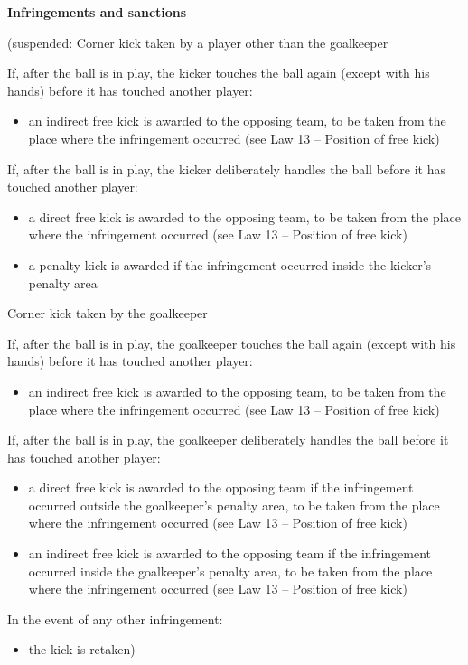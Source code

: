 \bigskip

{\bfseries Infringements and sanctions}

\headlinebox

{\color[rgb]{0.4,0.4,0.4}
(suspended: Corner kick taken by a player other than the goalkeeper

If, after the ball is in play, the kicker touches the ball again (except
with his hands) before it has touched another player:

\begin{itemize}
\item an indirect free kick is awarded to the opposing team, to be taken from
the place where the infringement occurred (see Law 13 -- Position of
free kick)
\end{itemize}

\bigskip

If, after the ball is in play, the kicker deliberately handles the ball
before it has touched another player:

\begin{itemize}
\item a direct free kick is awarded to the opposing team, to be taken from the
place where the infringement occurred (see Law 13 -- Position of free
kick) 
\item a penalty kick is awarded if the infringement occurred inside the
kicker{\textquoteright}s penalty area 
\end{itemize}

\bigskip

Corner kick taken by the goalkeeper

If, after the ball is in play, the goalkeeper touches the ball again
(except with his hands) before it has touched another player:

\begin{itemize}
\item an indirect free kick is awarded to the opposing team, to be taken from
the place where the infringement occurred (see Law 13 -- Position of
free kick)
\end{itemize}

\bigskip

If, after the ball is in play, the goalkeeper deliberately handles the
ball before it has touched another player:

\begin{itemize}
\item a direct free kick is awarded to the opposing team if the infringement
occurred outside the goalkeeper{\textquoteright}s penalty area, to be
taken from the place where the infringement occurred (see Law 13 --
Position of free kick)
\item an indirect free kick is awarded to the opposing team if the
infringement occurred inside the goalkeeper{\textquoteright}s penalty
area, to be taken from the place where the infringement occurred (see
Law 13 -- Position of free kick)
\end{itemize}

\bigskip

In the event of any other infringement:

\begin{itemize}
\item the kick is retaken)
\end{itemize}
}